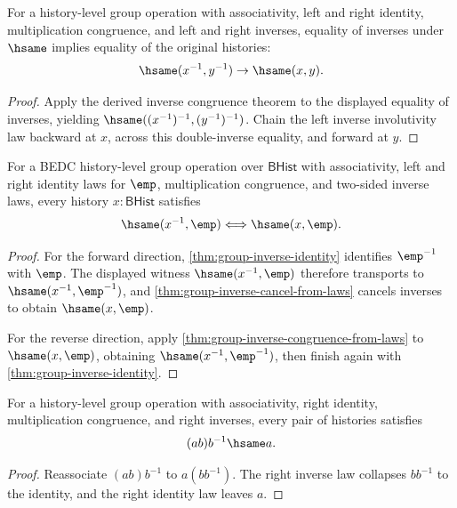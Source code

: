 \begin{theorem}
\label{thm:group-inverse-cancel-from-laws}
For a history-level group operation with associativity, left and right
identity, multiplication congruence, and left and right inverses, equality of
inverses under $\hsame$ implies equality of the original histories:
$$
\hsame(x^{-1},y^{-1})\to\hsame(x,y).
$$
\end{theorem}
\begin{proof}
Apply the derived inverse congruence theorem to the displayed equality of
inverses, yielding $\hsame((x^{-1})^{-1},(y^{-1})^{-1})$. Chain the left
inverse involutivity law backward at $x$, across this double-inverse equality,
and forward at $y$.
\end{proof}

\begin{theorem}
\label{thm:group-inverse-empty-iff}
For a BEDC history-level group operation over $\mathsf{BHist}$ with
associativity, left and right identity laws for $\emp$, multiplication
congruence, and two-sided inverse laws, every history $x:\mathsf{BHist}$
satisfies
$$
\hsame(x^{-1},\emp)\Longleftrightarrow\hsame(x,\emp).
$$
\end{theorem}
\begin{proof}
For the forward direction, \autoref{thm:group-inverse-identity} identifies
$\emp^{-1}$ with $\emp$. The displayed witness $\hsame(x^{-1},\emp)$ therefore
transports to $\hsame(x^{-1},\emp^{-1})$, and
\autoref{thm:group-inverse-cancel-from-laws} cancels inverses to obtain
$\hsame(x,\emp)$.

For the reverse direction, apply \autoref{thm:group-inverse-congruence-from-laws}
to $\hsame(x,\emp)$, obtaining $\hsame(x^{-1},\emp^{-1})$, then finish again
with \autoref{thm:group-inverse-identity}.
\end{proof}

\begin{theorem}
\label{thm:group-mul-right-inverse-cancel}
For a history-level group operation with associativity, right identity,
multiplication congruence, and right inverses, every pair of histories satisfies
$$
(ab)b^{-1}\hsame a.
$$
\end{theorem}
\begin{proof}
Reassociate $(ab)b^{-1}$ to $a(bb^{-1})$. The right inverse law collapses
$bb^{-1}$ to the identity, and the right identity law leaves $a$.
\end{proof}

